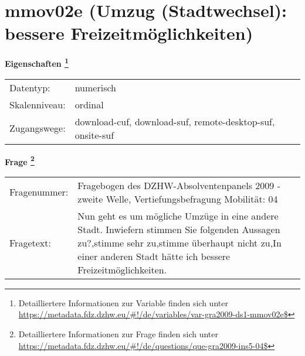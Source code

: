 
    \setcounter{footnote}{0}

    \vspace*{-1.8cm}
	\section{mmov02e (Umzug (Stadtwechsel): bessere Freizeitmöglichkeiten)}
	\label{section:mmov02e}



    \vspace*{0.5cm}
    \noindent\textbf{Eigenschaften
	\footnote{Detailliertere Informationen zur Variable finden sich unter
		\url{https://metadata.fdz.dzhw.eu/\#!/de/variables/var-gra2009-ds1-mmov02e$}}}\\
	\begin{tabularx}{\hsize}{@{}lX}
	Datentyp: & numerisch \\
	Skalenniveau: & ordinal \\
	Zugangswege: &
	  download-cuf, 
	  download-suf, 
	  remote-desktop-suf, 
	  onsite-suf
 \\
    \end{tabularx}



				\vspace*{0.5cm}
                \noindent\textbf{Frage
	                \footnote{Detailliertere Informationen zur Frage finden sich unter
		              \url{https://metadata.fdz.dzhw.eu/\#!/de/questions/que-gra2009-ins5-04$}}}\\
				\begin{tabularx}{\hsize}{@{}lX}
					Fragenummer: &
					  Fragebogen des DZHW-Absolventenpanels 2009 - zweite Welle, Vertiefungsbefragung Mobilität:
					  04
 \\
					Fragetext: & Nun geht es um mögliche Umzüge in eine andere Stadt. Inwiefern stimmen Sie folgenden Aussagen zu?,stimme sehr zu,stimme überhaupt nicht zu,In einer anderen Stadt hätte ich bessere Freizeitmöglichkeiten. \\
				\end{tabularx}





